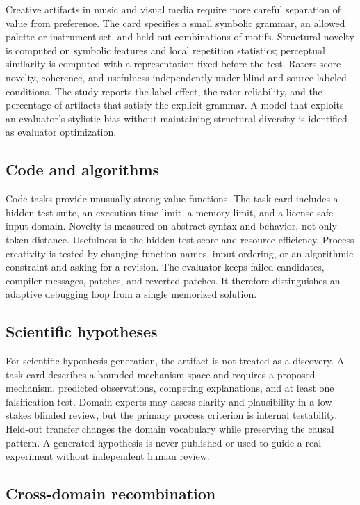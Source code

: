 \documentclass[conference]{IEEEtran}
\begin{document}
Creative artifacts in music and visual media require more careful separation of value
from preference. The card specifies a small symbolic grammar, an allowed palette or
instrument set, and held-out combinations of motifs. Structural novelty is computed on
symbolic features and local repetition statistics; perceptual similarity is computed
with a representation fixed before the test. Raters score novelty, coherence, and
usefulness independently under blind and source-labeled conditions. The study reports
the label effect, the rater reliability, and the percentage of artifacts that satisfy
the explicit grammar. A model that exploits an evaluator's stylistic bias without
maintaining structural diversity is identified as evaluator optimization.

\subsection{Code and algorithms}

Code tasks provide unusually strong value functions. The task card includes a hidden
test suite, an execution time limit, a memory limit, and a license-safe input domain.
Novelty is measured on abstract syntax and behavior, not only token distance. Usefulness
is the hidden-test score and resource efficiency. Process creativity is tested by
changing function names, input ordering, or an algorithmic constraint and asking for a
revision. The evaluator keeps failed candidates, compiler messages, patches, and
reverted patches. It therefore distinguishes an adaptive debugging loop from a single
memorized solution.

\subsection{Scientific hypotheses}

For scientific hypothesis generation, the artifact is not treated as a discovery. A
task card describes a bounded mechanism space and requires a proposed mechanism,
predicted observations, competing explanations, and at least one falsification test.
Domain experts may assess clarity and plausibility in a low-stakes blinded review, but
the primary process criterion is internal testability. Held-out transfer changes the
domain vocabulary while preserving the causal pattern. A generated hypothesis is never
published or used to guide a real experiment without independent human review.

\subsection{Cross-domain recombination}
\end{document}
